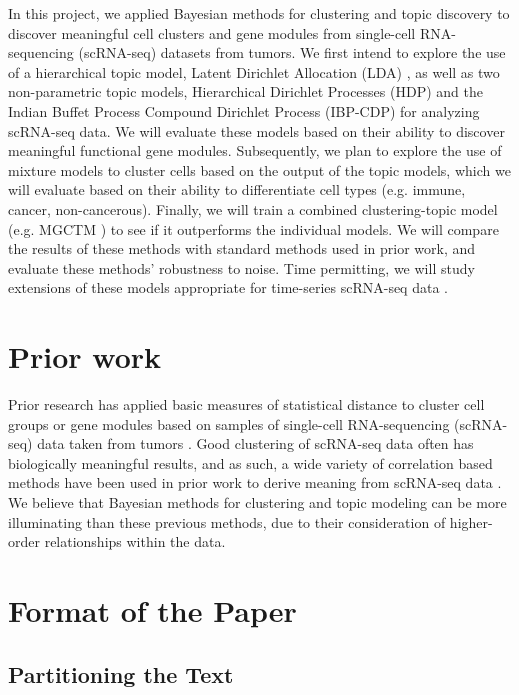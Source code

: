 \documentclass{article}
\begin{document}
In this project, we applied Bayesian methods for clustering and topic discovery to discover meaningful cell clusters and gene modules from single-cell RNA-sequencing (scRNA-seq) datasets from tumors. We first intend to explore the use of a hierarchical topic model, Latent Dirichlet Allocation (LDA) \cite{LDA}, as well as two non-parametric topic models, Hierarchical Dirichlet Processes (HDP) \cite{HDP} and the Indian Buffet Process Compound Dirichlet Process (IBP-CDP) \cite{IBP} for analyzing
scRNA-seq data. We will evaluate these models based on their ability to discover meaningful functional gene modules. Subsequently, we plan to explore the use of mixture models to cluster cells based on the output of the topic models, which we will evaluate based on their ability to differentiate cell types (e.g. immune, cancer, non-cancerous). Finally, we will train a combined clustering-topic model (e.g. MGCTM \cite{pengtao}) to see if it outperforms the individual models. We will compare the
results of these methods with standard methods used in prior work, and evaluate these methods' robustness to noise. Time permitting, we will study extensions of these models appropriate for time-series scRNA-seq data \cite{tsdpp}. \\

\section{Prior work}
Prior research has applied basic measures of statistical distance to cluster cell groups or gene modules based on samples of single-cell RNA-sequencing (scRNA-seq) data taken from tumors \cite{nature}.  Good clustering of scRNA-seq data often has biologically meaningful results, and as such, a wide variety of correlation based methods have been used in prior work to derive meaning from scRNA-seq data \cite{coexpression, consensus, profiling}. We believe that Bayesian methods for clustering and topic modeling can be more illuminating than these previous methods, due to their consideration of higher-order relationships within the data. \\


\section{Format of the Paper} 
 
\subsection{Partitioning the Text} 
\end{document}
